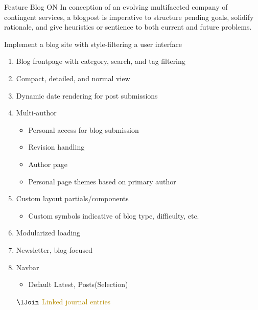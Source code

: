 \documentclass[7px]{article}
\begin{document}
\frontmatter
{Feature}
{Blog}
{ON}
{In conception of an evolving multifaceted company of contingent services, a blogpost is imperative to structure pending goals, solidify rationale, and give heuristics or sentience to both current and future problems.}

\strategy
{Implement a blog site with style-filtering a user interface}
{
  \begin{enumerate}
    \item Blog frontpage with category, search, and tag filtering
    \item Compact, detailed, and normal view
    \item Dynamic date rendering for post submissions
    \item Multi-author
      \small{
        \begin{itemize}[label=$\multimapdotinv$, leftmargin=1.7mm]
          \item Personal access for blog submission
          \item Revision handling
          \item Author page
          \item Personal page themes based on primary author
        \end{itemize}
      }
      \normalsize
    \item Custom layout partials/components
      \small{
        \begin{itemize}[label=$\multimapdotinv$, leftmargin=1.7mm]
          \item Custom symbols indicative of blog type, difficulty, etc.
        \end{itemize}
      }
      \normalsize
    \item Modularized loading
    \item Newsletter, blog-focused
    \item Navbar
      \small{
        \begin{itemize}[label=$\multimapdotinv$, leftmargin=1.7mm]
          \item Default\: Latest, Posts(Selection)
        \end{itemize}
      }
      \normalsize
    \item[$\lJoin$] \textcolor[HTML]{B58B00}{Linked journal entries}
  \end{enumerate}
}
\end{document}
